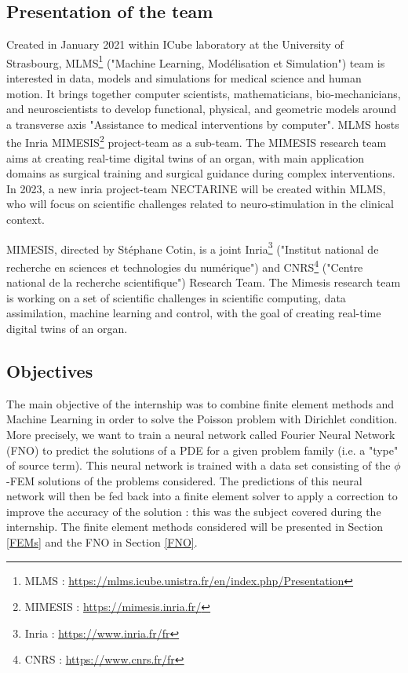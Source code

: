 \subsection{Presentation of the team}

Created in January 2021 within ICube laboratory at the University of Strasbourg, MLMS\footnote{MLMS : \url{https://mlms.icube.unistra.fr/en/index.php/Presentation}} ("Machine Learning, Modélisation et Simulation") team is interested in data, models and simulations for medical science and human motion. It brings together computer scientists, mathematicians, bio-mechanicians, and neuroscientists to develop functional, physical, and geometric models around a transverse axis "Assistance to medical interventions by computer". MLMS hosts the Inria MIMESIS\footnote{MIMESIS : \url{https://mimesis.inria.fr/}} project-team as a sub-team. The MIMESIS research team aims at creating real-time digital twins of an organ, with main application domains as surgical training and surgical guidance during complex interventions. In 2023, a new inria project-team NECTARINE will be created within MLMS, who will focus on scientific challenges related to neuro-stimulation in the clinical context. 

MIMESIS, directed by Stéphane Cotin, is a joint Inria\footnote{Inria : \url{https://www.inria.fr/fr}} ("Institut national de recherche en sciences et technologies du numérique") and CNRS\footnote{CNRS : \url{https://www.cnrs.fr/fr}} ("Centre national de la recherche scientifique") Research Team. The Mimesis research team is working on a set of scientific challenges in scientific computing, data assimilation, machine learning and control, with the goal of creating real-time digital twins of an organ.

\subsection{Objectives}

The main objective of the internship was to combine finite element methods and Machine Learning in order to solve the Poisson problem with Dirichlet condition. More precisely, we want to train a neural network called Fourier Neural Network (FNO) \cite{li_fourier_2021} to predict the solutions of a PDE for a given problem family (i.e. a "type" of source term). This neural network is trained with a data set consisting of the $\phi$-FEM solutions of the problems considered. The predictions of this neural network will then be fed back into a finite element solver to apply a correction to improve the accuracy of the solution : this was the subject covered during the internship. The finite element methods considered will be presented in Section \ref{FEMs} and the FNO in Section \ref{FNO}.

